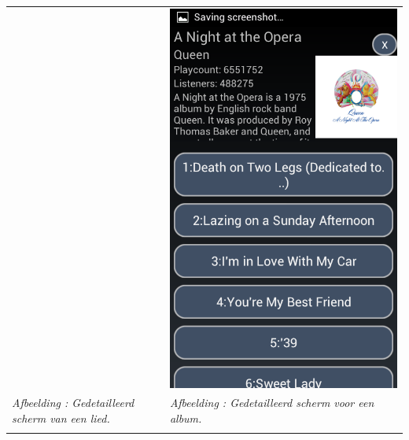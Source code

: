 \documentclass[11pt,a4paper]{article}
\newcounter{figc}
\newcommand{\figID} {%
   \stepcounter{figc}%
   \thefigc}
\begin{document}
{\begin{tabular} {p{7cm} >{\centering\arraybackslash}p{7cm}@{\hskip 0.5in}}
		& \includegraphics[scale=0.28]{Pictures/Screenshot_2013-05-24-21-20-57.png} \\
		
		\centering \small \textit{Afbeelding \figID : Gedetailleerd scherm van een lied.}  \normalsize
		&  \small \textit{Afbeelding \figID : Gedetailleerd scherm voor een album.} \\  \normalsize
		\vspace{1pt} & \vspace{1pt} \\
		

\end{tabular}}
\end{document}
